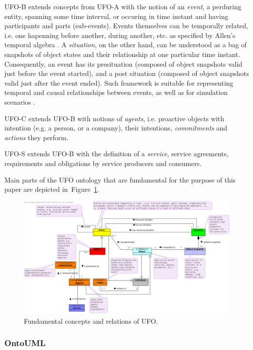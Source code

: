 \documentclass{lncs-template/llncs}
\begin{document}
UFO-B extends concepts from UFO-A with the notion of an \emph{event}, a perduring entity, spanning some time interval, or occuring in time instant and having participants and parts (sub-events). Events themselves can be temporally related, i.e. one hapenning before another, during another, etc. as specified by Allen's temporal algebra \cite{a1983mkti}. A \emph{situation}, on the other hand, can be understood as a bag of snapshots of object states and their relationship at one particular time instant. Consequently, an event has its presituation (composed of object snapshots valid just before the event started), and a post situation (composed of object snapshots valid just after the event ended). Such framework is suitable for representing temporal and causal relationships between events, as well as for simulation scenarios \cite{gwaga2013tofcme}.

UFO-C extends UFO-B with notions of \emph{agents}, i.e. proactive objects with intention (e.g. a person, or a company), their intentions, \emph{commitments} and \emph{actions} they perform.

UFO-S extends UFO-B with the definition of a \emph{service}, service agreements, requirements and obligations by service producers and consumers.

Main parts of the UFO ontology that are fundamental for the purpose of this paper are depicted in~Figure~\ref{fig:ufo}.

\begin{figure}
 \includegraphics[width=1.0\textwidth]{images/ufo.png}
 \caption{Fundamental concepts and relations of UFO.}\label{fig:ufo}
\end{figure}

\subsubsection{OntoUML}\label{sec:oum}
\end{document}

